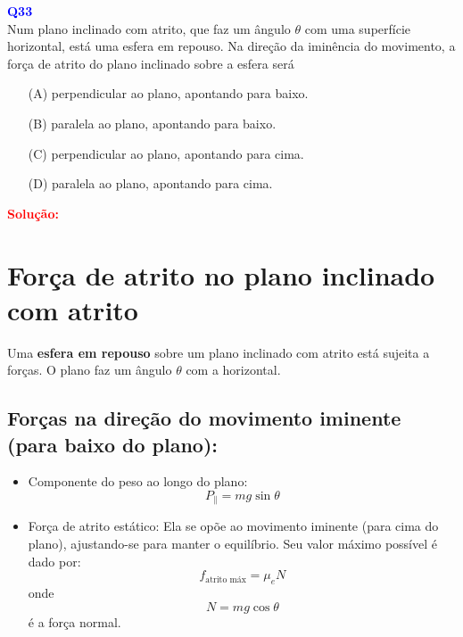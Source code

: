 \documentclass[a4paper,12pt]{article}
\begin{document}
\begin{flushleft}
\textbf{\textcolor{blue}{\Large Q33}}\\
\noindent
Num plano inclinado com atrito, que faz um ângulo $\theta$ com
uma superfície horizontal, está uma esfera em repouso. Na
direção da iminência do movimento, a força de atrito do
plano inclinado sobre a esfera será

\begin{itemize}
\item[(A)] perpendicular ao plano, apontando para baixo.
\item[(B)] paralela ao plano, apontando para baixo.
\item[(C)] perpendicular ao plano, apontando para cima.
\item[(D)] paralela ao plano, apontando para cima.
\end{itemize}

\vspace{0.5cm}

\textcolor{red}{\textbf{Solução:}}\\

\section*{Força de atrito no plano inclinado com atrito}

Uma \textbf{esfera em repouso} sobre um plano inclinado com atrito está sujeita a forças.  
O plano faz um ângulo \( \theta \) com a horizontal.

\subsection*{Forças na direção do movimento iminente (para baixo do plano):}

\begin{itemize}
  \item Componente do peso ao longo do plano:
  \begin{equation*}
    P_{\parallel} = mg \sin\theta
  \end{equation*}

  \item Força de atrito estático:  
  Ela se opõe ao movimento iminente (para cima do plano), ajustando-se para manter o equilíbrio.  
  Seu valor máximo possível é dado por:
  \begin{equation*}
    f_{\text{atrito máx}} = \mu_e N
  \end{equation*}
  onde
  \begin{equation*}
    N = mg \cos\theta
  \end{equation*}
  é a força normal.
\end{itemize}


\end{flushleft}
\end{document}
